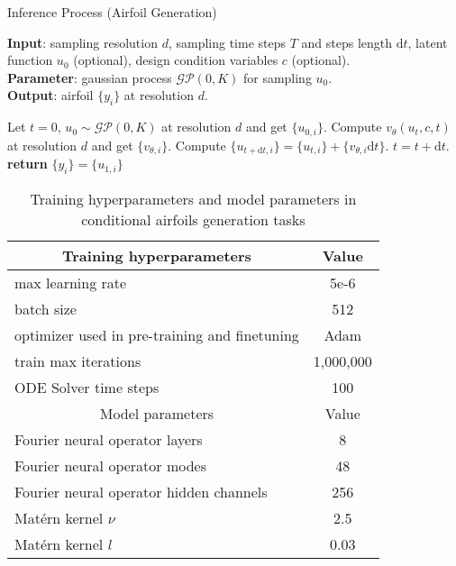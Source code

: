 \begin{algorithm}[h]
    \caption{Inference Process (Airfoil Generation)}
    \label{alg:generation}
    \textbf{Input}: sampling resolution $d$, sampling time steps $T$ and steps length $\mathrm{d}t$, latent function $u_0$ (optional), design condition variables $c$ (optional).\\
    \textbf{Parameter}: gaussian process $\mathcal{GP}(0,K)$ for sampling $u_0$.\\
    \textbf{Output}: airfoil $\{y_i\}$ at resolution $d$. \\
    \begin{algorithmic}[1] %
        \STATE Let $t=0$, $u_0\sim\mathcal{GP}(0,K)$ at resolution $d$ and get $\{u_{0,i}\}$.
        \STATE Compute $v_{\theta}(u_t,c,t)$ at resolution $d$ and get $\{v_{\theta,i}\}$.
        \STATE Compute $\{u_{t+\mathrm{d}t,i}\}=\{u_{t,i}\}+\{v_{\theta,i}\mathrm{d}t\}$.
        \STATE $t=t+\mathrm{d}t$.
        \ENDWHILE
        \STATE \textbf{return} $\{y_i\}=\{u_{1,i}\}$
    \end{algorithmic}
\end{algorithm}

\begin{table}[h]
    \centering
    \renewcommand{\arraystretch}{1.2} %
    \caption{Training hyperparameters and model parameters in conditional airfoils generation tasks}
    \begin{tabularx}{\linewidth}{Xc}
        \toprule
        \multicolumn{1}{c}{Training hyperparameters} & Value \\
        \midrule
        max learning rate & 5e-6 \\
        batch size & 512 \\
        optimizer used in pre-training and finetuning & Adam \\
        train max iterations & 1,000,000 \\
        ODE Solver time steps & 100 \\
        \midrule
        \multicolumn{1}{c}{Model parameters} & Value \\
        \midrule
        Fourier neural operator layers & 8 \\
        Fourier neural operator modes & 48 \\
        Fourier neural operator hidden channels & 256 \\
        Matérn kernel $\nu$ & 2.5 \\
        Matérn kernel $l$ & 0.03 \\
        \bottomrule
    \end{tabularx}
    \label{tab:geoparams}
\end{table}

